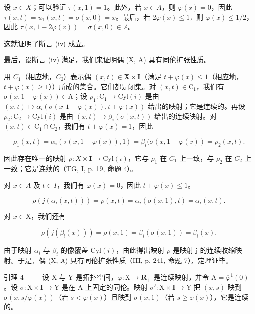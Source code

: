 设 \(x \in X\)；可以验证 \(\tau(x,1) = 1\)。此外，若 \(x \in A\)，则 \(\varphi(x) = 0\)，因此 \(\tau(x,t) = u_{1}(x,t) = \sigma(x,0) = x\)。最后，若 \(2\varphi(x) \leqslant 1\)，则 \(\varphi(x) \leqslant 1/2\)，因此 \(\tau(x,1 - 2\varphi(x)) = \sigma(x,0) \in A\)。

这就证明了断言 (iv) 成立。

最后，设断言 (iv) 满足，我们来证明偶 (X, A) 具有同伦扩张性质。

用 \(C_{1}\)（相应地，\(C_{2}\)）表示偶 \((x,t)\in\mathbf{X}\times\mathbf{I}\)（满足 \(t+\varphi(x)\leqslant1\)（相应地，\(t+\varphi(x)\geqslant1\)））所成的集合。它们都是闭集。对 \((x,t)\in\mathrm{C}_{1}\)，我们有 \(\sigma(x,1-\varphi(x))\in\mathrm{A}\)；设 \(\rho_{1}\colon\mathrm{C}_{1}\to\mathrm{Cyl}(i)\) 是由 \((x,t)\mapsto\alpha_{i}(\sigma(x,1-\varphi(x)),t+\varphi(x))\) 给出的映射；它是连续的。再设 \(\rho_{2}\colon\mathrm{C}_{2}\to\mathrm{Cyl}(i)\) 是由 \((x,t)\mapsto\beta_{i}(\sigma(x,t))\) 给出的连续映射。对 \((x,t)\in\mathrm{C}_{1}\cap\mathrm{C}_{2}\)，我们有 \(t+\varphi(x)=1\)，因此

\[
\rho_ {1} (x, t) = \alpha_ {i} (\sigma (x, 1 - \varphi (x)), 1) = \beta_ {i} (\sigma (x, 1 - \varphi (x)) = \rho_ {2} (x, t).
\]

因此存在唯一的映射 \(\rho\colon X\times\mathbf{I}\to\mathrm{Cyl}(i)\)，它与 \(\rho_{1}\) 在 \(C_{1}\) 上一致，与 \(\rho_{2}\) 在 \(C_{2}\) 上一致；它是连续的（TG, I, p. 19, 命题 4）。

对 \(x \in A\) 及 \(t \in I\)，我们有 \(\varphi(x) = 0\)，因此 \(t + \varphi(x) \leqslant 1\)。

\[
\rho (j (\alpha_ {i} (x, t))) = \rho (x, t) = \alpha_ {i} (\sigma (x, 1), t) = \alpha_ {i} (x, t).
\]

对 \(x\in \mathrm{X}\)，我们还有

\[
\rho (j (\beta_ {i} (x))) = \rho (x, 1) = \beta_ {i} (\sigma (x, 1)) = \beta_ {i} (x).
\]

由于映射 \(\alpha_{i}\) 与 \(\beta_{i}\) 的像覆盖 \(\mathrm{Cyl}(i)\)，由此得出映射 \(\rho\) 是映射 j 的连续收缩映射。于是，偶 (X, A) 具有同伦扩张性质（III, p. 241, 命题 7），定理证毕。

引理 4 —— 设 X 与 Y 是拓扑空间，\(\varphi\colon\mathrm{X}\to\mathbf{R}_{+}\) 是连续映射，并令 \(\mathrm{A}=\overline{\varphi}^{1}(0)\)。设 \(\sigma\colon\mathrm{X}\times\mathbf{I}\to\mathrm{Y}\) 是在 A 上固定的同伦。映射 \(\sigma'\colon\mathrm{X}\times\mathbf{I}\to\mathrm{Y}\) 把 \((x,s)\) 映到 \(\sigma(x,s/\varphi(x))\)（若 \(s<\varphi(x)\)）且映到 \(\sigma(x,1)\)（若 \(s\geqslant\varphi(x)\)），它是连续的。

